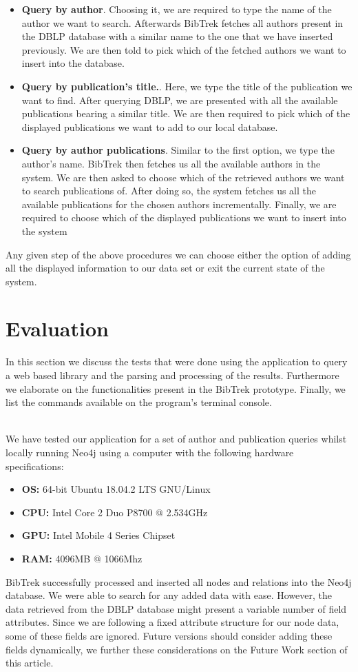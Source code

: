 \documentclass[twocolumn]{article}
\begin{document}
\begin{itemize}
\item \textbf{Query by author}. Choosing it, we are required to type the name of the author we want to search. Afterwards BibTrek fetches all authors present in the DBLP database with a similar name to the one that we have inserted previously. We are then told to pick which of the fetched authors we want to insert into the database.
\item \textbf{Query by publication's title.}. Here, we type the title of the publication we want to find. After querying DBLP, we are presented with all the available publications bearing a similar title. We are then required to pick which of the displayed publications we want to add to our local database.
\item \textbf{Query by author publications}. Similar to the first option, we type the author's name. BibTrek then fetches us all the available authors in the system. We are then asked to choose which of the retrieved authors we want to search publications of. After doing so, the system fetches us all the available publications for the chosen authors incrementally. Finally, we are required to choose which of the displayed publications we want to insert into the system
\end{itemize}
Any given step of the above procedures we can choose either the option of adding all the displayed information to our data set or exit the current state of the system.

\section{Evaluation}
In this section we discuss the tests that were done using the application to query a web based library and the parsing and processing of the results. Furthermore we elaborate on the functionalities present in the BibTrek prototype. Finally, we list the commands available on the program's terminal console.

\\[1\baselineskip]
We have tested our application for a set of author and publication queries whilst locally running Neo4j using a computer with the following hardware specifications:
\begin{itemize}
\item \textbf{OS:} 64-bit Ubuntu 18.04.2 LTS GNU/Linux 
\item \textbf{CPU:} Intel Core 2 Duo P8700 @ 2.534GHz 
\item \textbf{GPU:} Intel Mobile 4 Series Chipset
\item \textbf{RAM:} 4096MB @ 1066Mhz 
\end{itemize}
BibTrek successfully processed and inserted all nodes and relations into the Neo4j database. We were able to search for any added data with ease. However, the data retrieved from the DBLP database might present a variable number of field attributes. Since we are following a fixed attribute structure for our node data, some of these fields are ignored. Future versions should consider adding these fields dynamically, we further these considerations on the Future Work section of this article.
\end{document}
